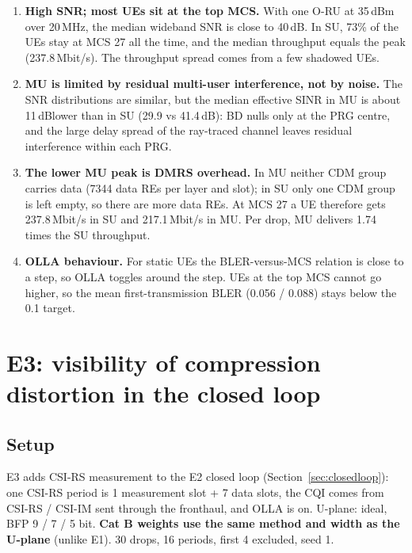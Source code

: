 \documentclass[11pt,a4paper]{article}
\newcommand{\dB}{\,dB}
\begin{document}
\begin{enumerate}
  \item \textbf{High SNR; most UEs sit at the top MCS.} With one O-RU at 35\,dBm over 20\,MHz, the median wideband SNR is close to
        40\dB. In SU, 73\% of the UEs stay at MCS 27 all the time, and the median throughput equals the peak (237.8\,Mbit/s). The
        throughput spread comes from a few shadowed UEs.
  \item \textbf{MU is limited by residual multi-user interference, not by noise.} The SNR distributions are similar, but the
        median effective SINR in MU is about 11\dB lower than in SU (29.9 vs 41.4\dB): BD nulls only at the PRG centre, and the
        large delay spread of the ray-traced channel leaves residual interference within each PRG.
  \item \textbf{The lower MU peak is DMRS overhead.} In MU neither CDM group carries data (7344 data REs per layer and slot); in SU
        only one CDM group is left empty, so there are more data REs. At MCS 27 a UE therefore gets 237.8\,Mbit/s in SU and
        217.1\,Mbit/s in MU. Per drop, MU delivers 1.74 times the SU throughput.
  \item \textbf{OLLA behaviour.} For static UEs the BLER-versus-MCS relation is close to a step, so OLLA toggles around the
        step. UEs at the top MCS cannot go higher, so the mean first-transmission BLER (0.056 / 0.088) stays below the 0.1 target.
\end{enumerate}

\section{E3: visibility of compression distortion in the closed loop}

\subsection{Setup}

E3 adds CSI-RS measurement to the E2 closed loop (Section~\ref{sec:closedloop}): one CSI-RS period is 1 measurement slot +
7 data slots, the CQI comes from CSI-RS / CSI-IM sent through the fronthaul, and OLLA is on. U-plane: ideal, BFP 9 / 7 / 5 bit.
\textbf{Cat B weights use the same method and width as the U-plane} (unlike E1). 30 drops, 16 periods, first 4 excluded, seed 1.
\end{document}
